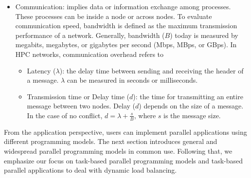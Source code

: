 \begin{itemize}
	\item Communication: implies data or information exchange among processes. These processes can be inside a node or across nodes. To evaluate communication speed, bandwidth is defined as the maximum transmission performance of a network. Generally, bandwidth ($B$) today is measured by megabits, megabytes, or gigabytes per second (Mbps, MBps, or GBps). In HPC networks, communication overhead refers to
	\begin{itemize}
		\item Latency ($\lambda$): the delay time between sending and receiving the header of a message. $\lambda$ can be measured in seconds or milliseconds.
		\item Transmission time or Delay time ($d$): the time for transmitting an entire message between two nodes. Delay ($d$) depends on the size of a message. In the case of no conflict, $d = \lambda + \frac{s}{B}$, where $s$ is the message size. 
	\end{itemize}

\end{itemize}

From the application perspective, users can implement parallel applications using different programming models. The next section introduces general and widespread parallel programming models in common use. Following that, we emphasize our focus on task-based parallel programming models and task-based parallel applications to deal with dynamic load balancing.


	

